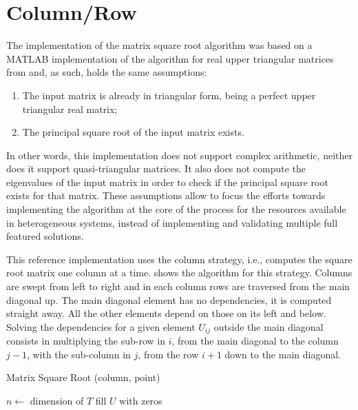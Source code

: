 \documentclass[../thesis]{subfiles}
\begin{document}
	\section{Column/Row}
	\label{sec:multicore:column}
	The implementation of the matrix square root algorithm was based on a MATLAB implementation of the algorithm for real upper triangular matrices from \cite{Deadman:Higham:Ralha:2013} and, as such, holds the same assumptions:
		\begin{enumerate}
			\item The input matrix is already in triangular form, being a perfect upper triangular real matrix;
			\item The principal square root of the input matrix exists.
		\end{enumerate}
	In other words, this implementation does not support complex arithmetic, neither does it support quasi-triangular matrices. It also does not compute the eigenvalues of the input matrix in order to check if the principal square root exists for that matrix. These assumptions allow to focus the efforts towards implementing the algorithm at the core of the process for the resources available in heterogeneous systems, instead of implementing and validating multiple full featured solutions.

	This reference implementation uses the column strategy, i.e., computes the square root matrix one column at a time.  shows the algorithm for this strategy. Columns are swept from left to right and in each column rows are traversed from the main diagonal up. The main diagonal element has no dependencies, it is computed straight away. All the other elements depend on those on its left and below. Solving the dependencies for a given element $U_{ij}$ outside the main diagonal consists in multiplying the sub-row in $i$, from the main diagonal to the column $j-1$, with the sub-column in $j$, from the row $i+1$ down to the main diagonal.

	\begin{algorithm}[htp]
		\caption{Matrix Square Root (column, point)}
		\label{alg:sqrtm:column:point}
		\DontPrintSemicolon


		$n \leftarrow$ dimension of $T$\;
		fill $U$ with zeros\;

	\end{algorithm}
\end{document}
